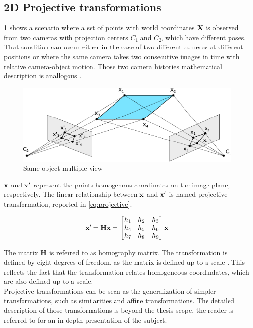 \subsection{2D Projective transformations}
\cref{fig:twoview} shows a scenario where a set of points with world coordinates $\mathrm{\textbf{X}}$ is observed from two cameras with projection centers $C_1$ and $C_2$, which have different poses. 
That condition can occur either in the case of two different cameras at different positions or where the same camera takes two consecutive images in time with relative camera-object motion. Those two camera histories mathematical description is anallogous \cite{hartley2003multiple}. 

\begin{figure}[!ht]
    \centering
    \includegraphics[width=0.9\linewidth]{Images/two-view.pdf}
    \caption{Same object multiple view}
    \label{fig:twoview}
\end{figure}

$\mathrm{\textbf{x}}$ and $\mathrm{\textbf{x}}'$  represent the points homogenous coordinates on the image plane, respectively. 
The linear relationship between $\mathrm{\textbf{x}}$ and $\mathrm{\textbf{x}}'$ is named projective transformation, reported in \cref{eq:projective}.

\begin{equation}
\label{eq:projective}
    \mathrm{\textbf{x}}' = \mathrm{\textbf{H}}\mathrm{\textbf{x}} = \begin{bmatrix}
        h_1 &h_2 &h_3 \\ h_4 &h_5& h_6 \\ h_7 &h_8 &h_9
    \end{bmatrix}\mathrm{\textbf{x}}
\end{equation}

The matrix $\mathrm{\textbf{H}}$ is referred to as homography matrix. The transformation is defined by eight degrees of freedom, as the matrix is defined up to a scale \cite{dubrofsky2009homography}. This reflects the fact that the transformation relates homogeneous coordindates, which are also defined up to a scale. \\
Projective transformations can be seen as the generalization of simpler transformations, such as similarities and affine transformations. The detailed description of those transformations is beyond the thesis scope, the reader is referred to \cite{hartley2003multiple} for an in depth presentation of the subject.


